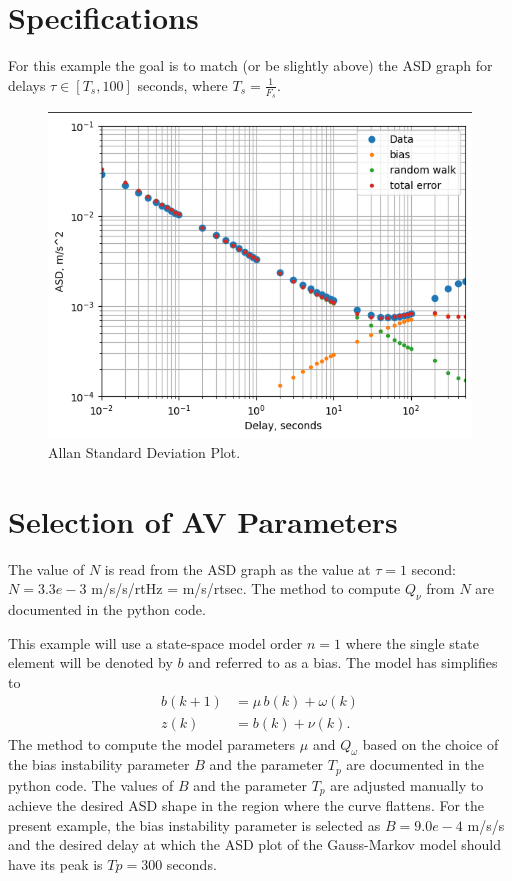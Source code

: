\documentclass[letter,twocolumn]{article}
\begin{document}
\section{Specifications}
For this example the goal is to match (or be slightly above) the ASD graph for delays $\tau\in[T_s, 100]$ seconds, where $T_s = \frac{1}{F_s}$.


\begin{figure}[bth]
	\centering
	\includegraphics[trim=0in 0in 0in 0.1in, clip, width=0.9\columnwidth]{figure/ASD_plot}
	\caption{Allan Standard Deviation Plot.}
	\label{fig:ASD_plot}
\end{figure}

\section{Selection of AV Parameters}
The value of $N$ is read from the ASD graph as the value at $\tau = 1$ second: $N= 3.3e-3$ m/s/s/rtHz = m/s/rtsec. The method to compute $Q_\nu$ from $N$ are documented in the python code.  


This example will use a state-space model order $n=1$ where the single state element will be denoted by $b$ and referred to as a bias. The model has simplifies to 
\begin{align}
	b(k+1) &= \mu\, b(k) + \omega(k) \\
	z(k)   &= b(k) + \nu(k).
\end{align}
The method to compute the  model parameters $\mu$ and $Q_\omega$ based on the choice of the bias instability parameter $B$ and the parameter $T_p$ are documented in the python code. The values of $B$ and the parameter $T_p$ are adjusted manually to achieve the desired ASD shape in the region where the curve flattens. 
For the present example, the bias instability parameter is selected as
$B  = 9.0e-4$ m/s/s
and the desired delay at which the ASD plot of the Gauss-Markov model should have its peak is
$Tp = 300$  seconds.
\end{document}
